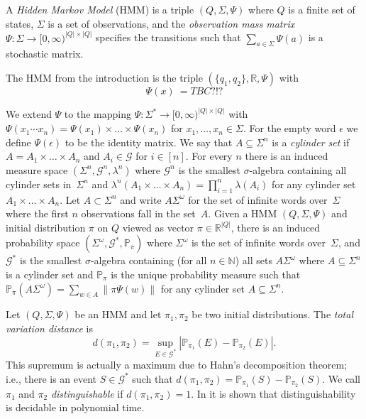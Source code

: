 \documentclass[a4paper,UKenglish,cleveref, autoref,mathscr]{lipics-v2019}
\newcommand{\RR}{\mathbb{R}}
\newcommand{\NN}{\mathbb{N}}
\newcommand{\PP}{\mathbb{P}}
\newcommand{\GG}{\mathscr{G}}
\newcommand{\1}{\mathbbm{1}}
\begin{document}
\begin{definition}\label{HMMdef}
A \emph{Hidden Markov Model} (HMM) is a triple $(Q, \Sigma, \Psi)$ where $Q$ is a finite set of states, $\Sigma$ is a set of observations, and the \emph{observation mass matrix} $\Psi : \Sigma \rightarrow [0,\infty)^{|Q| \times |Q|}$ specifies the transitions such that $\sum_{a \in \Sigma} \Psi(a)$ is a stochastic matrix.
\end{definition}
\begin{example} \label{ex-HMMdef}
The HMM from the introduction is the triple $(\{q_1, q_2\}, \mathbb{R}, \Psi)$ with
\begin{equation}
\Psi(x) \ = TBC?!?
\end{equation}
\end{example}
We extend $\Psi$ to the mapping $\Psi : \Sigma^* \rightarrow [0,\infty)^{|Q| \times |Q|}$ with $\Psi(x_1 \cdots x_n) = \Psi(x_1) \times \dots \times \Psi(x_n)$ for $x_1, \dots, x_n \in \Sigma$. For the empty word $\epsilon$ we define $\Psi(\epsilon)$ to be the identity matrix. We say that $A \subseteq \Sigma^n$ is a \emph{cylinder set} if $A = A_1 \times \dots \times A_n$ and $A_i \in \GG$ for $i \in [n]$. For every $n$ there is an induced measure space $(\Sigma^n, \GG^n, \lambda^n)$ where $\GG^n$ is the smallest $\sigma$-algebra containing all cylinder sets in~$\Sigma^n$ and $\lambda^n(A_1 \times \dots \times A_n) = \prod_{i = 1}^n \lambda(A_i)$ for any cylinder set $A_1 \times \dots \times A_n$. Let $A \subset \Sigma^n$ and write $A \Sigma^\omega$ for the set of infinite words over~$\Sigma$ where the first $n$ observations fall in the set~$A$. Given a HMM $(Q, \Sigma, \Psi)$ and initial distribution $\pi$ on $Q$ viewed as vector $\pi \in \RR^{|Q|}$, there is an induced probability space $(\Sigma^\omega, \GG^*, \PP_\pi)$ where $\Sigma^\omega$ is the set of infinite words over~$\Sigma$, and $\GG^*$ is the smallest $\sigma$-algebra containing (for all $n \in \NN$) all sets $A \Sigma^\omega$ where $A\subseteq \Sigma^n$ is a cylinder set and $\PP_\pi$ is the unique probability measure such that
$\PP_\pi(A \Sigma^\omega) =  \sum_{w \in A} \| \pi  \Psi(w) \|$
for any cylinder set $A \subseteq \Sigma^n$.

Let $(Q, \Sigma, \Psi)$ be an HMM and let $\pi_1, \pi_2$ be two initial distributions. The \emph{total variation distance} is 
\begin{equation*}
d(\pi_1, \pi_2) = \sup_{E \in \GG^*} | \PP_{\pi_1}(E) - \PP_{\pi_2}(E) |.
\end{equation*}
This supremum is actually a maximum due to Hahn's decomposition theorem; i.e., there is an event $S \in \GG^*$ such that $d(\pi_1, \pi_2) = \PP_{\pi_1}(S) - \PP_{\pi_2}(S)$. We call $\pi_1$ and $\pi_2$ \emph{distinguishable} if $d(\pi_1, \pi_2) = 1$. In \cite{kief14} it is shown that distinguishability is decidable in polynomial time.
\end{document}
